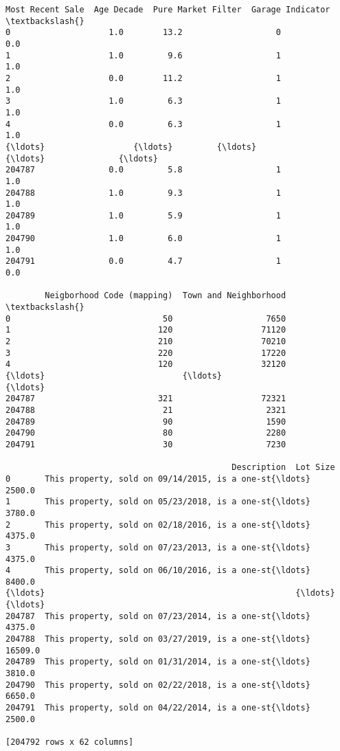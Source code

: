 \documentclass[11pt]{article}
\begin{document}
\begin{tcolorbox}[breakable, size=fbox, boxrule=.5pt, pad at break*=1mm, opacityfill=0]
\begin{Verbatim}[commandchars=\\\{\}]
        Most Recent Sale  Age Decade  Pure Market Filter  Garage Indicator  \textbackslash{}
0                    1.0        13.2                   0               0.0
1                    1.0         9.6                   1               1.0
2                    0.0        11.2                   1               1.0
3                    1.0         6.3                   1               1.0
4                    0.0         6.3                   1               1.0
{\ldots}                  {\ldots}         {\ldots}                 {\ldots}               {\ldots}
204787               0.0         5.8                   1               1.0
204788               1.0         9.3                   1               1.0
204789               1.0         5.9                   1               1.0
204790               1.0         6.0                   1               1.0
204791               0.0         4.7                   1               0.0

        Neigborhood Code (mapping)  Town and Neighborhood  \textbackslash{}
0                               50                   7650
1                              120                  71120
2                              210                  70210
3                              220                  17220
4                              120                  32120
{\ldots}                            {\ldots}                    {\ldots}
204787                         321                  72321
204788                          21                   2321
204789                          90                   1590
204790                          80                   2280
204791                          30                   7230

                                              Description  Lot Size
0       This property, sold on 09/14/2015, is a one-st{\ldots}    2500.0
1       This property, sold on 05/23/2018, is a one-st{\ldots}    3780.0
2       This property, sold on 02/18/2016, is a one-st{\ldots}    4375.0
3       This property, sold on 07/23/2013, is a one-st{\ldots}    4375.0
4       This property, sold on 06/10/2016, is a one-st{\ldots}    8400.0
{\ldots}                                                   {\ldots}       {\ldots}
204787  This property, sold on 07/23/2014, is a one-st{\ldots}    4375.0
204788  This property, sold on 03/27/2019, is a one-st{\ldots}   16509.0
204789  This property, sold on 01/31/2014, is a one-st{\ldots}    3810.0
204790  This property, sold on 02/22/2018, is a one-st{\ldots}    6650.0
204791  This property, sold on 04/22/2014, is a one-st{\ldots}    2500.0

[204792 rows x 62 columns]
\end{Verbatim}
\end{tcolorbox}
        
\end{document}
